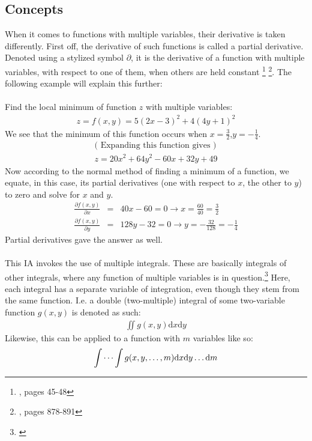 \subsection{Concepts}
When it comes to functions with multiple variables, their derivative is taken differently. First off, the derivative of such functions is called a partial derivative. Denoted using a stylized symbol $\partial$, it is the derivative of a function with multiple variables, with respect to one of them, when others are held constant \footnote{\cite{matthews_1998}, pages 45-48} \footnote{\cite{stewart_2008_deriv}, pages 878-891}. The following example will explain this further:\\
\\
Find the local minimum of function $z$ with multiple variables:
\begin{gather*}
z = f(x,y) = 5(2x-3)^{2} + 4(4y+1)^{2}
\end{gather*}
We see that the minimum of this function occurs when $x= \frac{3}{2} $,$ y= -\frac{1}{4}$.
\begin{gather*}
\text{( Expanding this function gives )}\\
z = 20x^{2} + 64y^{2} -60x + 32y +49
\end{gather*}
Now according to the normal method of finding a minimum of a function, we equate, in this case, its partial derivatives (one with respect to $x$, the other to $y$) to zero and solve for $x$ and $y$.
\begin{eqnarray*}
\frac{\partial f(x,y)}{\partial x}  &=&  40x-60 = 0 \rightarrow x = \frac{60}{40}=\frac{3}{2}\\
\frac{\partial f(x,y)}{\partial y}  &=&  128y-32 = 0 \rightarrow y = -\frac{32}{128}=-\frac{1}{4}
\end{eqnarray*}
Partial derivatives gave the answer as well.\\
\\
This IA invokes the use of multiple integrals. These are basically integrals of other integrals, where any function of multiple variables is in question.\footnote{\cite{stewart_2008_int}} Here, each integral has a separate variable of integration, even though they stem from the same function. I.e. a double (two-multiple) integral of some two-variable function $g(x,y)$ is denoted as such:
\begin{gather*}
\iint g(x,y) \mathrm{d}x\mathrm{d}y
\end{gather*}
Likewise, this can be applied to a function with $m$ variables like so:
\begin{gather*}
\idotsint g(x,y,\dots,m) \mathrm{d}x\mathrm{d}y \dots \mathrm{d}m
\end{gather*}
